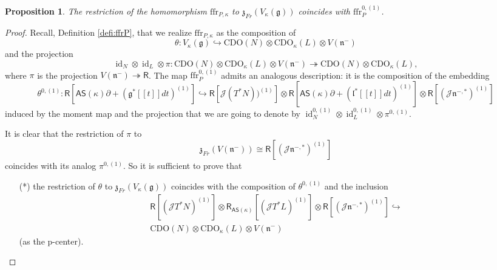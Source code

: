 \documentclass{amsart}
\newtheorem{Prop}[Thm]{Proposition}
\theoremstyle{definition}
\newcommand{\Ring}{\mathsf{R}}
\newcommand{\g}{\mathfrak{g}}
\newcommand{\ffr}{\mathrm{ffr}}
\newcommand{\lf}{\mathfrak{l}}
\newcommand{\Jet}{\mathscr{J}}
\newcommand{\AS}{\mathsf{AS}}
\newcommand{\CDO}{\mathrm{CDO}}
\newcommand{\frz}{\mathfrak{z}}
\numberwithin{equation}{section}
\begin{document}
\begin{Prop}\label{Prop:ffr_p_center}
The restriction of the homomorphism $\ffr_{P,\kappa}$ to 
$\frz_{Fr}(V_\kappa(\g))$ coincides with 
$\ffr^{0,(1)}_{P}$. 
\end{Prop}
\begin{proof}
Recall, Definition \ref{defi:ffrP}, that we realize $\ffr_{P,\kappa}$ as the composition of 
$$\theta: V_{\kappa}(\g) \hookrightarrow \CDO(N) \otimes \CDO_\kappa(L)\otimes V(\mathfrak{n}^-)$$
and the projection
$$\operatorname{id}_N\otimes\operatorname{id}_L\otimes\pi: \CDO(N)\otimes \CDO_\kappa(L)\otimes V(\mathfrak{n}^-)\twoheadrightarrow \CDO(N)\otimes \CDO_\kappa(L),$$
where $\pi$ is the projection $V(\mathfrak{n}^-)\twoheadrightarrow \Ring$.
The map $\ffr^{0,(1)}_P$ admits an analogous description: it is the composition of the embedding 
$$\theta^{0,(1)}:\Ring\left[\AS(\kappa)\partial+ (\g^*[[t]]dt)^{(1)}\right]\hookrightarrow \Ring[\Jet (T^*N))^{(1)}]\otimes\Ring\left[\AS(\kappa)\partial+ (\lf^*[[t]]dt)^{(1)}\right]\otimes \Ring[(\Jet\mathfrak{n}^{-,*})^{(1)}]$$
induced by the moment map and the projection that we are going to denote by $\operatorname{id}_N^{0,(1)}\otimes\operatorname{id}^{0,(1)}_L\otimes\pi^{0,(1)}$.

It is clear that the restriction 
of $\pi$ to $$\mathfrak{z}_{Fr}(V(\mathfrak{n}^-))\cong \Ring[(\Jet\mathfrak{n}^{-,*})^{(1)}]$$ coincides with its analog $\pi^{0,(1)}$. So it is sufficient to prove that 
\begin{itemize}
\item[(*)]
the restriction of $\theta$
to $\mathfrak{z}_{Fr}(V_\kappa(\g))$ coincides with the composition of $\theta^{0,(1)}$ and the inclusion 
\begin{align*}&\Ring[(\Jet T^*N)^{(1)}]\otimes \Ring_{\AS(\kappa)}[(\Jet T^*L)^{(1)}]\otimes \Ring[(\Jet\mathfrak{n}^{-,*})^{(1)}]\hookrightarrow \\&\CDO(N) \otimes \CDO_\kappa(L)\otimes V(\mathfrak{n}^-)\end{align*}
(as the p-center).
\end{itemize}


\end{proof}
\end{document}

